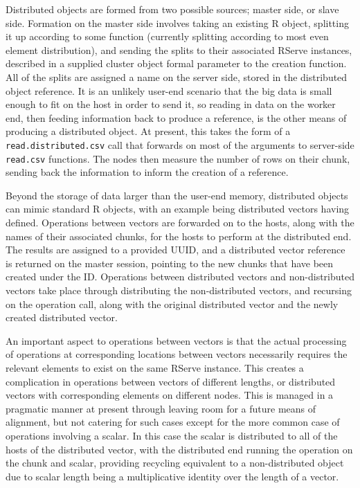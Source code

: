 \documentclass[a4paper,10pt]{article}
\begin{document}
Distributed objects are formed from two possible sources; master side, or slave
side.
Formation on the master side involves taking an existing R object, splitting it
up according to some function (currently splitting according to most even
element distribution), and sending the splits to their associated RServe
instances, described in a supplied cluster object formal parameter to the
creation function.
All of the splits are assigned a name on the server side, stored in the
distributed object reference.
It is an unlikely user-end scenario that the big data is small enough to fit on
the host in order to send it, so reading in data on the worker end, then
feeding information back to produce a reference, is the other means of
producing a distributed object.
At present, this takes the form of a \texttt{read.distributed.csv} call that
forwards on most of the arguments to server-side \texttt{read.csv} functions. 
The nodes then measure the number of rows on their chunk, sending back the
information to inform the creation of a reference.

Beyond the storage of data larger than the user-end memory, distributed objects
can mimic standard R objects, with an example being distributed vectors having
 defined.
Operations between vectors are forwarded on to the hosts, along with the names
of their associated chunks, for the hosts to perform at the distributed end.
The results are assigned to a provided UUID, and a distributed vector reference
is returned on the master session, pointing to the new chunks that have been
created under the ID.
Operations between distributed vectors and non-distributed vectors take place
through distributing the non-distributed vectors, and recursing on the
operation call, along with the original distributed vector and the newly
created distributed vector.

An important aspect to operations between vectors is that the actual processing
of operations at corresponding locations between vectors necessarily requires
the relevant elements to exist on the same RServe instance.
This creates a complication in operations between vectors of different lengths,
or distributed vectors with corresponding elements on different nodes.
This is managed in a pragmatic manner at present through leaving room for a
future means of alignment, but not catering for such cases except for the more
common case of operations involving a scalar. 
In this case the scalar is distributed to all of the hosts of the distributed
vector, with the distributed end running the operation on the chunk and scalar,
providing recycling equivalent to a non-distributed object due to scalar length
being a multiplicative identity over the length of a vector.
\end{document}

